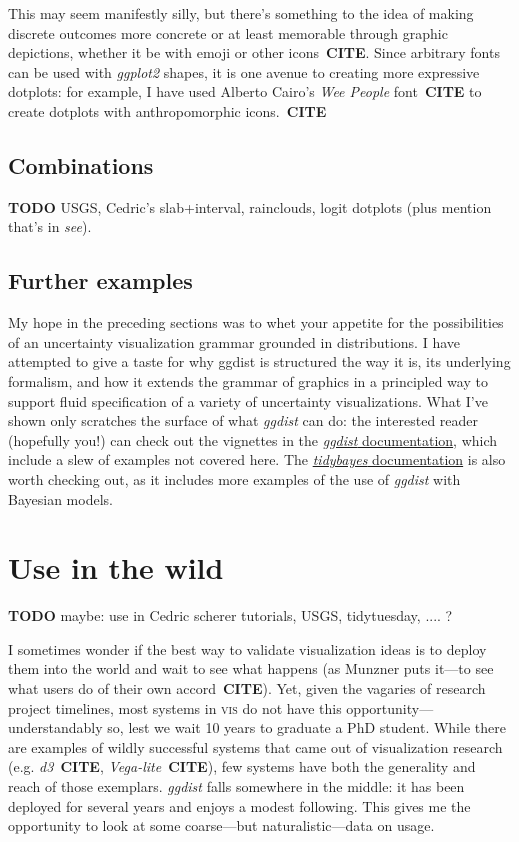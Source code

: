 \documentclass[journal]{vgtc}                     %
\begin{document}
This may seem manifestly silly, but there's something to the idea of making discrete outcomes more concrete or at least memorable through graphic depictions, whether it be with emoji or other icons~\textbf{CITE}. Since arbitrary fonts can be used with \textit{ggplot2} shapes, it is one avenue to creating more expressive dotplots: for example, I have used Alberto Cairo's \textit{Wee People} font~\textbf{CITE} to create dotplots with anthropomorphic icons.~\textbf{CITE}

\subsection{Combinations}

\textbf{TODO} USGS, Cedric's slab+interval, rainclouds, logit dotplots (plus mention that's in \textit{see}).

\subsection{Further examples}

My hope in the preceding sections was to whet your appetite for the possibilities of an uncertainty visualization grammar grounded in distributions. I have attempted to give a taste for why ggdist is structured the way it is, its underlying formalism, and how it extends the grammar of graphics in a principled way to support fluid specification of a variety of uncertainty visualizations. What I've shown only scratches the surface of what \textit{ggdist} can do: the interested reader (hopefully you!) can check out the vignettes in the \href{https://mjskay.github.io/ggdist/}{\textit{ggdist} documentation}, which include a slew of examples not covered here. The \href{https://mjskay.github.io/tidybayes/}{\textit{tidybayes} documentation} is also worth checking out, as it includes more examples of the use of \textit{ggdist} with Bayesian models.

\section{Use in the wild}
\label{sec:use-in-the-wild}

\textbf{TODO} maybe: use in Cedric scherer tutorials, USGS, tidytuesday,   .... ?

I sometimes wonder if the best way to validate visualization ideas is to deploy them into the world and wait to see what happens (as Munzner puts it---to see what users do of their own accord~\textbf{CITE}). Yet, given the vagaries of research project timelines, most systems in \textsc{vis} do not have this opportunity---understandably so, lest we wait 10 years to graduate a PhD student. While there are examples of wildly successful systems that came out of visualization research (e.g. \textit{d3}~\textbf{CITE}, \textit{Vega-lite}~\textbf{CITE}), few systems have both the generality and reach of those exemplars. \textit{ggdist} falls somewhere in the middle: it has been deployed for several years and enjoys a modest following. This gives me the opportunity to look at some coarse---but naturalistic---data on usage.
\end{document}
